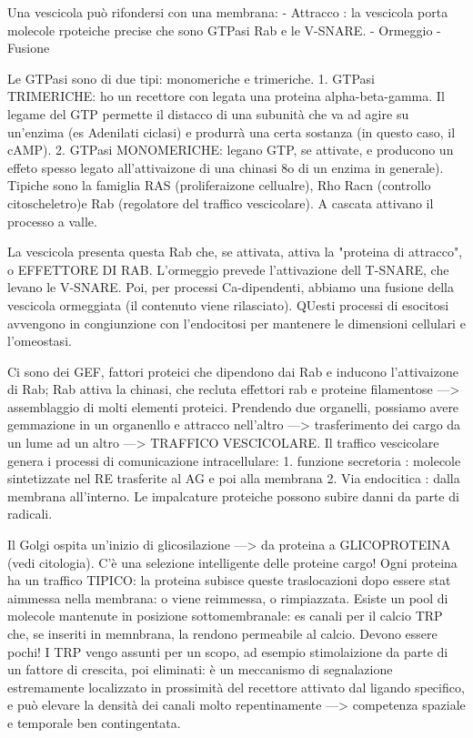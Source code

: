 \documentclass[a4paper,12pt]{article}
\begin{document}
Una vescicola può rifondersi con una membrana: 
- Attracco : la vescicola porta molecole rpoteiche precise che sono GTPasi Rab e le V-SNARE.
- Ormeggio
- Fusione

Le GTPasi sono di due tipi: monomeriche e trimeriche.
1. GTPasi TRIMERICHE: ho un recettore con legata una proteina alpha-beta-gamma. Il legame del GTP permette il distacco di una subunità che va ad agire su un'enzima (es Adenilati ciclasi) e produrrà una certa sostanza (in questo caso, il cAMP).
2. GTPasi MONOMERICHE: legano GTP, se attivate, e producono un effeto spesso legato all'attivaizone di una chinasi 8o di un enzima in generale). Tipiche sono la famiglia RAS (proliferaizone cellualre), Rho Racn (controllo citoscheletro)e Rab (regolatore del traffico vescicolare). A cascata attivano il processo a valle.

La vescicola presenta questa Rab che, se attivata, attiva la "proteina di attracco", o EFFETTORE DI RAB. L'ormeggio prevede l'attivazione dell T-SNARE, che levano le V-SNARE. Poi, per processi Ca-dipendenti, abbiamo una fusione della vescicola ormeggiata (il contenuto viene rilasciato).
QUesti processi di esocitosi avvengono in congiunzione con l'endocitosi per mantenere le dimensioni cellulari e l'omeostasi.

Ci sono dei GEF, fattori proteici che dipendono dai Rab e inducono l'attivaizone di Rab; Rab attiva la chinasi, che recluta effettori rab e proteine filamentose ---> assemblaggio di molti elementi proteici.
Prendendo due organelli, possiamo avere gemmazione in un organenllo e attracco nell'altro ---> trasferimento dei cargo da un lume ad un altro ---> TRAFFICO VESCICOLARE.
Il traffico vescicolare genera i processi di comunicazione intracellulare:
1. funzione secretoria : molecole sintetizzate nel RE trasferite al AG e poi alla membrana
2. Via endocitica : dalla membrana all'interno. Le impalcature proteiche possono subire danni da parte di radicali.

Il Golgi ospita un'inizio di glicosilazione ---> da proteina a GLICOPROTEINA (vedi citologia). C'è una selezione intelligente delle proteine cargo!
Ogni proteina ha un traffico TIPICO: la proteina subisce queste traslocazioni dopo essere stat aimmessa nella membrana: o viene reimmessa, o rimpiazzata. 
Esiste un pool di molecole mantenute in posizione sottomembranale: es canali per il calcio TRP che, se inseriti in memnbrana, la rendono permeabile al calcio. Devono essere pochi! I TRP vengo assunti per un scopo, ad esempio stimolaizione da parte di un fattore di crescita, poi eliminati: è un meccanismo di segnalazione estremamente localizzato in prossimità del recettore attivato dal ligando specifico, e può elevare la densità dei canali molto repentinamente ---> competenza spaziale e temporale ben contingentata. 
\end{document}
